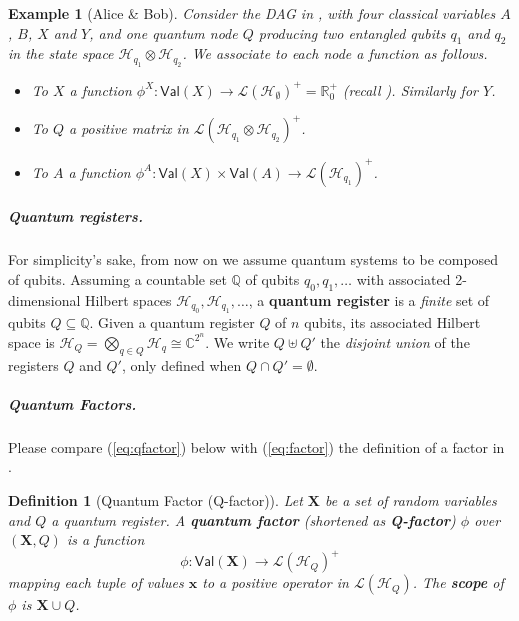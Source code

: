 \documentclass[10pt,a4paper]{article}
\newcommand*{\ie}{\emph{i.e.}\xspace}
\newcommand{\textdef}[1]{\textbf{#1}}
\newcommand*{\definitive}[1]{\textbf{#1}}
\newcommand{\Real}{\mathbb{R}}
\newcommand*{\tens}{\otimes}
\newcommand{\nnReal}{\Real^+_0}
\newcommand*{\setofrv}[1]{\mathsf{Val}(#1)}
\newcommand{\bX}{\mathbf X}
\newcommand{\bx}{{\mathbf x}}
\renewcommand{\L}{\mathcal{L}}
\newcommand{\Pos}[1]{{\L(#1)}^+}
\newcommand*{\C}{\mathbb{C}}
\newcommand{\HH}{\mathcal{H}}
\newcommand{\reg}{Q}
\newcommand{\qreg}{\reg}
\newcommand*{\someqfact}{\phi}
\newcommand*{\qfactor}{Q-factor}
\newtheorem{definition}[theorem]{Definition}
\newtheorem{example}[theorem]{Example}
\begin{document}
\begin{example}[Alice \& Bob]
Consider the DAG in , with four classical variables $A$, $B$, $X$ and $Y$, and one quantum node $\qreg$ producing two entangled qubits $q_1$ and $q_2$ in the state space $\HH_{q_1}\tens\HH_{q_2}$.
We associate to each node a function as follows.
\begin{itemize}
\item
To $X$ a function $\phi^X: \setofrv{X}\to\Pos{\HH_{\emptyset}}=\nnReal$ (recall ).
Similarly for $Y$.
\item
To $\qreg$ a positive matrix in $\Pos{\HH_{q_1}\tens\HH_{q_2}}$.
\item
To $A$ a function $\phi^A:\setofrv{X}\times\setofrv{A} \to \Pos{\HH_{q_1}}$.
\end{itemize}
\end{example}


\subparagraph*{Quantum registers.}

For simplicity's sake, from now on we assume quantum systems to be composed of qubits.
Assuming a countable set $\mathbb{Q}$ of qubits $q_0,q_1,\dots$ with associated 2-dimensional Hilbert spaces $\HH_{q_0},\HH_{q_1},\dots$, a \textdef{quantum register} is a \emph{finite} set of qubits $\qreg \subseteq \mathbb{Q}$.
Given a quantum register $\qreg$ of $n$ qubits, its associated Hilbert space is $\HH_{\qreg} = \bigotimes_{q \in \qreg} \HH_{q} \cong \C^{2^n}$.
We write $\qreg \uplus \qreg'$ the \emph{disjoint union} of the registers $\qreg$ and $\qreg'$, only defined when $\qreg \cap \qreg' = \emptyset$.

\subparagraph*{Quantum Factors.}

Please compare (\ref{eq:qfactor}) below with (\ref{eq:factor}) the definition of a factor in .

\begin{definition}[Quantum Factor (\qfactor)]
Let $\bX$ be a set of random variables and $\qreg$ a quantum register.
A \definitive{quantum factor} (shortened as \definitive{\qfactor}) $\phi$ over $(\bX,\qreg)$ is a function
\begin{equation}\label{eq:qfactor}
\someqfact: \setofrv{\bX} \to \Pos{\HH_\qreg}
\end{equation}
mapping each tuple of values $\bx$ to a \emph{positive} operator in $\L(\HH_\qreg)$.
The \definitive{scope} of $\someqfact$ is $\bX\cup\qreg$.
\end{definition}
\end{document}

